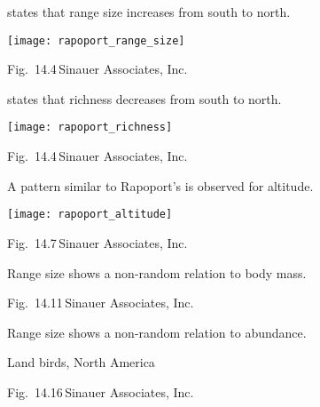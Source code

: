 \documentclass[t]{beamer}
\begin{document}
%
%
\begin{frame}[t]{ states that range size increases from south to north.}
	\begin{center}
		\texttt{[image: rapoport\_range\_size]}
	\end{center}

	\vfilll

	\tiny \hfill Fig.~14.4\,\textcopyright Sinauer Associates, Inc.

\end{frame}
%
%
%
\begin{frame}[t]{ states that richness decreases from south to north.}
	\begin{center}
		\texttt{[image: rapoport\_richness]}
	\end{center}

	\vfilll

	\tiny \hfill Fig.~14.4\,\textcopyright Sinauer Associates, Inc.

\end{frame}
%
\begin{frame}[t]{A pattern similar to Rapoport's is observed for altitude.}
	\begin{center}
		\texttt{[image: rapoport\_altitude]}
	\end{center}


	\vfilll

	\tiny \hfill Fig.~14.7\,\textcopyright Sinauer Associates, Inc.

\end{frame}
%
{
\begin{frame}[t]{Range size shows a non-random relation to body mass.}

	\vfilll

	\tiny \hfill Fig.~14.11\,\textcopyright Sinauer Associates, Inc.

\end{frame}
}
%
{
\begin{frame}[t]{Range size shows a non-random relation to abundance.}

	
	\hspace{2.5cm} Land birds, North America

	\vfilll

	\tiny \hfill Fig.~14.16\,\textcopyright Sinauer Associates, Inc.
\end{frame}
}
\end{document}
